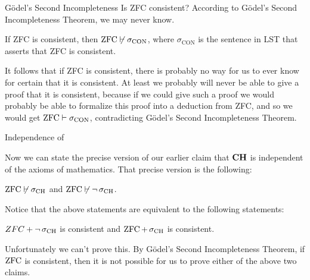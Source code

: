 \documentclass[pdf,final]{prosper}
\newcommand{\skipsmall}{\vspace{1em}}
\begin{document}
\begin{slide}{G\"odel's Second Incompleteness}
Is ZFC consistent? According to G\"odel's Second Incompleteness Theorem, we may never
know. 

\skipsmall

\begin{theorem}
If ZFC is consistent, then $\operatorname{ZFC}\not\vdash\sigma_{\text{CON}}$, where $\sigma_{\text{CON}}$ is the
sentence in LST that asserts that ZFC is consistent.
\end{theorem}

\skipsmall

It follows that if ZFC is consistent, there is probably no way for us to ever
know for certain that it is consistent. At least we probably will never be able
to give a proof that it is consistent, because if we could give such a proof we
would probably be able to formalize this proof into a deduction from ZFC,
and so we would get $\operatorname{ZFC}\vdash\sigma_{\text{CON}}$, contradicting
G\"odel's Second Incompleteness Theorem.


\end{slide}

\begin{slide}{Independence of \CH}

Now we can state the precise version of our earlier claim that $\textbf{CH}$ is
independent of the axioms of mathematics. That precise version is the following:

\skipsmall

 $\operatorname{ZFC}\not\vdash\operatorname{\sigma_{\text{CH}}}$ and $\operatorname{ZFC}\not\vdash\neg\operatorname{\sigma_{\text{CH}}}$.

\skipsmall
Notice that the above statements
are equivalent to the following statements: 

\skipsmall

$ZFC+\neg\operatorname{\sigma_{\text{CH}}}$ is consistent
and $\operatorname{ZFC}+\operatorname{\sigma_{\text{CH}}}$ is consistent.

\skipsmall

Unfortunately we can't prove this. By G\"odel's Second Incompleteness Theorem,
if $\operatorname{ZFC}$ is
consistent, then it is not possible for us to prove either of the above two claims.

\end{slide}
\end{document}
